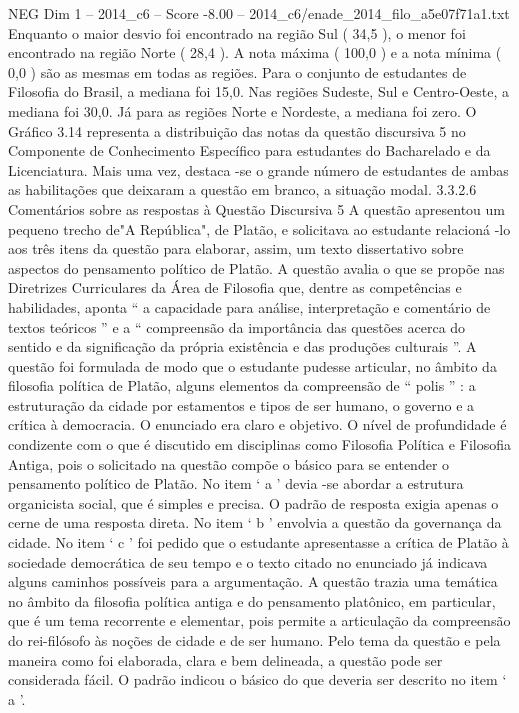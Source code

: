 \begin{textsample}{NEG Dim 1 – 2014\_c6 – Score -8.00 – 2014\_c6/enade\_2014\_filo\_a5e07f71a1.txt}
Enquanto o maior desvio foi encontrado na região Sul ( 34,5 ), o menor foi encontrado na região Norte ( 28,4 ).
A nota máxima ( 100,0 ) e a nota mínima ( 0,0 ) são as mesmas em todas as regiões.
Para o conjunto de estudantes de Filosofia do Brasil, a mediana foi 15,0.
Nas regiões Sudeste, Sul e Centro-Oeste, a mediana foi 30,0.
Já para as regiões Norte e Nordeste, a mediana foi zero.
O Gráfico 3.14 representa a distribuição das notas da questão discursiva 5 no Componente de Conhecimento Específico para estudantes do Bacharelado e da Licenciatura.
Mais uma vez, destaca -se o grande número de estudantes de ambas as habilitações que deixaram a questão em branco, a situação modal. 3.3.2.6 Comentários sobre as respostas à Questão Discursiva 5 A questão apresentou um pequeno trecho de"A República", de Platão, e solicitava ao estudante relacioná -lo aos três itens da questão para elaborar, assim, um texto dissertativo sobre aspectos do pensamento político de Platão.
A questão avalia o que se propõe nas Diretrizes Curriculares da Área de Filosofia que, dentre as competências e habilidades, aponta “ a capacidade para análise, interpretação e comentário de textos teóricos ” e a “ compreensão da importância das questões acerca do sentido e da significação da própria existência e das produções culturais ”.
A questão foi formulada de modo que o estudante pudesse articular, no âmbito da filosofia política de Platão, alguns elementos da compreensão de “ polis ” : a estruturação da cidade por estamentos e tipos de ser humano, o governo e a crítica à democracia.
O enunciado era claro e objetivo.
O nível de profundidade é condizente com o que é discutido em disciplinas como Filosofia Política e Filosofia Antiga, pois o solicitado na questão compõe o básico para se entender o pensamento político de Platão.
No item ‘ a ’ devia -se abordar a estrutura organicista social, que é simples e precisa.
O padrão de resposta exigia apenas o cerne de uma resposta direta.
No item ‘ b ’ envolvia a questão da governança da cidade.
No item ‘ c ’ foi pedido que o estudante apresentasse a crítica de Platão à sociedade democrática de seu tempo e o texto citado no enunciado já indicava alguns caminhos possíveis para a argumentação.
A questão trazia uma temática no âmbito da filosofia política antiga e do pensamento platônico, em particular, que é um tema recorrente e elementar, pois permite a articulação da compreensão do rei-filósofo às noções de cidade e de ser humano.
Pelo tema da questão e pela maneira como foi elaborada, clara e bem delineada, a questão pode ser considerada fácil.
O padrão indicou o básico do que deveria ser descrito no item ‘ a ’.

\end{textsample}
